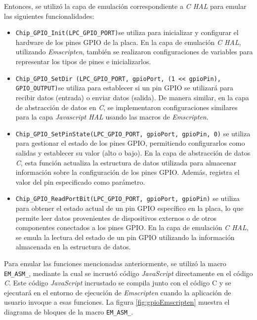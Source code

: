 Entonces, se utilizó la capa de emulación correspondiente a \textit{C HAL} para emular las siguientes funcionalidades:

\begin{itemize}
	\item \texttt{Chip\_GPIO\_Init(LPC\_GPIO\_PORT)}se utiliza para inicializar y configurar el hardware de los pines GPIO de la placa. En la capa de emulación \textit{C HAL}, utilizando  \textit{Emscripten}, también se realizaron configuraciones de variables para representar los tipos de pines e inicializarlos.
	
	\item \texttt{Chip\_GPIO\_SetDir (LPC\_GPIO\_PORT, gpioPort, \newline (1 \<<\<<  gpioPin), GPIO\_OUTPUT)}se utiliza para establecer si un pin GPIO se utilizará para recibir datos (entrada) o enviar datos (salida). De manera similar, en la capa de abstracción de datos en \textit{C}, se implementaron configuraciones similares para la capa \textit{Javascript HAL} usando las macros de \textit{Emscripten}.
	
	\item \texttt{Chip\_GPIO\_SetPinState(LPC\_GPIO\_PORT, gpioPort, \newline gpioPin, 0)} se utiliza para gestionar el estado de los pines GPIO, permitiendo configurarlos como salidas y establecer su valor (alto o bajo). En la capa de abstracción de datos \textit{C}, esta función actualiza la estructura de datos utilizada para almacenar información sobre la configuración de los pines GPIO. Además, registra el valor del pin especificado como parámetro.

	\item \texttt{Chip\_GPIO\_ReadPortBit(LPC\_GPIO\_PORT, gpioPort, \newline gpioPin)} se utiliza para obtener el estado actual de un pin GPIO específico en la placa, lo que permite leer datos provenientes de dispositivos externos o de otros componentes conectados a los pines GPIO. En la capa de emulación \textit{C HAL}, se emula la lectura del estado de un pin GPIO utilizando la información almacenada en la estructura de datos.
\end{itemize}

Para emular las funciones mencionadas anteriormente, se utilizó la macro \newline \texttt{EM\_ASM\_}, mediante la cual se incrustó código \textit{JavaScript} directamente en el código \textit{C}. Este código \textit{JavaScript} incrustado se compila junto con el código C y se ejecutará en el entorno de ejecución de \textit{Emscripten}  cuando la aplicación de usuario invoque a esas funciones. La figura \ref{fig:gpioEmscripten} muestra el diagrama de bloques de la macro \texttt{EM\_ASM\_}.

